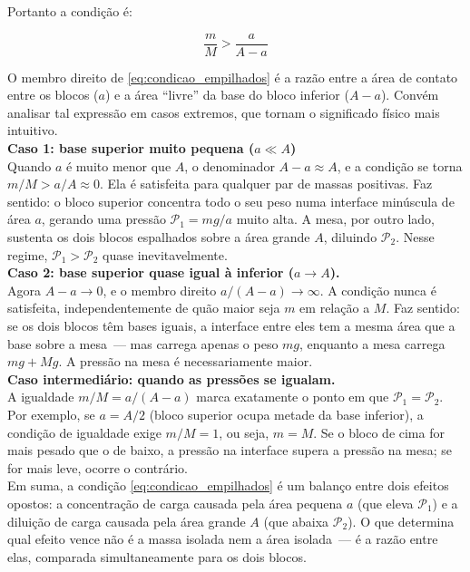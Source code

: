 \begin{exemplo}
Portanto a condição é:
 
\begin{equation}
    \boxed{\frac{m}{M} > \frac{a}{A - a}}
    \label{eq:condicao_empilhados}
\end{equation}
 
O membro direito de \eqref{eq:condicao_empilhados}
é a razão entre a área de contato entre os blocos ($a$) e a área
``livre'' da base do bloco inferior ($A - a$). Convém analisar tal expressão em casos extremos, que tornam o significado físico mais intuitivo. \\

\textbf{Caso 1: base superior muito pequena ($a \ll A$)} \\
Quando $a$ é muito menor que $A$, o denominador $A - a \approx A$,
e a condição se torna $m/M > a/A \approx 0$. Ela é satisfeita para
qualquer par de massas positivas. Faz sentido: o bloco superior
concentra todo o seu peso numa interface minúscula de área $a$,
gerando uma pressão $\mathcal{P}_1 = mg/a$ muito alta. A mesa, por
outro lado, sustenta os dois blocos espalhados sobre a área grande
$A$, diluindo $\mathcal{P}_2$. Nesse regime, $\mathcal{P}_1 >
\mathcal{P}_2$ quase inevitavelmente. \\
 
\textbf{Caso 2: base superior quase igual à inferior ($a \to A$).} \\
Agora $A - a \to 0$, e o membro direito $a/(A - a) \to \infty$.
A condição nunca é satisfeita, independentemente de quão maior
seja $m$ em relação a $M$. Faz sentido: se os dois blocos têm bases
iguais, a interface entre eles tem a mesma área que a base sobre a
mesa~--- mas carrega apenas o peso $mg$, enquanto a mesa carrega
$mg + Mg$. A pressão na mesa é necessariamente maior.\\
 
\textbf{Caso intermediário: quando as pressões se igualam.} \\
A igualdade $m/M = a/(A - a)$ marca exatamente o ponto em que
$\mathcal{P}_1 = \mathcal{P}_2$. Por exemplo, se $a = A/2$ (bloco
superior ocupa metade da base inferior), a condição de igualdade
exige $m/M = 1$, ou seja, $m = M$. Se o bloco de cima for mais
pesado que o de baixo, a pressão na interface supera a pressão na
mesa; se for mais leve, ocorre o contrário. \\
 
Em suma, a condição \eqref{eq:condicao_empilhados}
é um balanço entre dois efeitos opostos: a concentração de carga
causada pela área pequena $a$ (que eleva $\mathcal{P}_1$) e a
diluição de carga causada pela área grande $A$ (que abaixa
$\mathcal{P}_2$). O que determina qual efeito vence não é a massa
isolada nem a área isolada~--- é a razão entre elas, comparada
simultaneamente para os dois blocos.
 


\end{exemplo}

